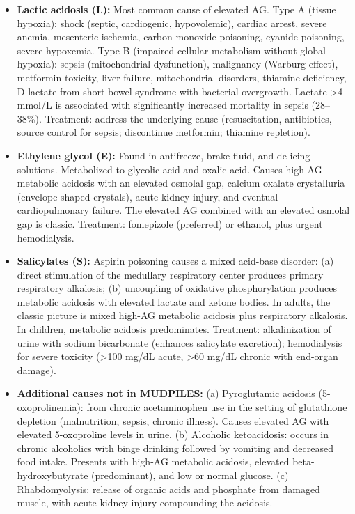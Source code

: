 \begin{itemize}
  \item \textbf{Lactic acidosis (L):} Most common cause of elevated AG. Type A (tissue hypoxia): shock (septic, cardiogenic, hypovolemic), cardiac arrest, severe anemia, mesenteric ischemia, carbon monoxide poisoning, cyanide poisoning, severe hypoxemia. Type B (impaired cellular metabolism without global hypoxia): sepsis (mitochondrial dysfunction), malignancy (Warburg effect), metformin toxicity, liver failure, mitochondrial disorders, thiamine deficiency, D-lactate from short bowel syndrome with bacterial overgrowth. Lactate >4 mmol/L is associated with significantly increased mortality in sepsis (28--38\%). Treatment: address the underlying cause (resuscitation, antibiotics, source control for sepsis; discontinue metformin; thiamine repletion).
  \item \textbf{Ethylene glycol (E):} Found in antifreeze, brake fluid, and de-icing solutions. Metabolized to glycolic acid and oxalic acid. Causes high-AG metabolic acidosis with an elevated osmolal gap, calcium oxalate crystalluria (envelope-shaped crystals), acute kidney injury, and eventual cardiopulmonary failure. The elevated AG combined with an elevated osmolal gap is classic. Treatment: fomepizole (preferred) or ethanol, plus urgent hemodialysis.
  \item \textbf{Salicylates (S):} Aspirin poisoning causes a mixed acid-base disorder: (a) direct stimulation of the medullary respiratory center produces primary respiratory alkalosis; (b) uncoupling of oxidative phosphorylation produces metabolic acidosis with elevated lactate and ketone bodies. In adults, the classic picture is mixed high-AG metabolic acidosis plus respiratory alkalosis. In children, metabolic acidosis predominates. Treatment: alkalinization of urine with sodium bicarbonate (enhances salicylate excretion); hemodialysis for severe toxicity (>100 mg/dL acute, >60 mg/dL chronic with end-organ damage).
  \item \textbf{Additional causes not in MUDPILES:} (a) Pyroglutamic acidosis (5-oxoprolinemia): from chronic acetaminophen use in the setting of glutathione depletion (malnutrition, sepsis, chronic illness). Causes elevated AG with elevated 5-oxoproline levels in urine. (b) Alcoholic ketoacidosis: occurs in chronic alcoholics with binge drinking followed by vomiting and decreased food intake. Presents with high-AG metabolic acidosis, elevated beta-hydroxybutyrate (predominant), and low or normal glucose. (c) Rhabdomyolysis: release of organic acids and phosphate from damaged muscle, with acute kidney injury compounding the acidosis.

\end{itemize}
